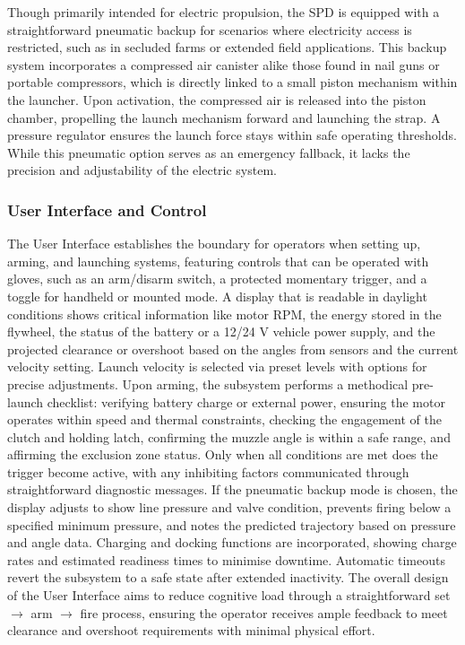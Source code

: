 \documentclass[a4paper,10pt]{article} %
\begin{document}
Though primarily intended for electric propulsion, the SPD is equipped with a straightforward pneumatic backup for scenarios where electricity access is restricted, such as in secluded farms or extended field applications. This backup system incorporates a compressed air canister alike those found in nail guns or portable compressors, which is directly linked to a small piston mechanism within the launcher. Upon activation, the compressed air is released into the piston chamber, propelling the launch mechanism forward and launching the strap. A pressure regulator ensures the launch force stays within safe operating thresholds. While this pneumatic option serves as an emergency fallback, it lacks the precision and adjustability of the electric system.


\subsubsection{User Interface and Control}

The User Interface establishes the boundary for operators when setting up, arming, and launching systems, featuring controls that can be operated with gloves, such as an arm/disarm switch, a protected momentary trigger, and a toggle for handheld or mounted mode. A display that is readable in daylight conditions shows critical information like motor RPM, the energy stored in the flywheel, the status of the battery or a 12/24 V vehicle power supply, and the projected clearance or overshoot based on the angles from sensors and the current velocity setting. Launch velocity is selected via preset levels with options for precise adjustments. Upon arming, the subsystem performs a methodical pre-launch checklist: verifying battery charge or external power, ensuring the motor operates within speed and thermal constraints, checking the engagement of the clutch and holding latch, confirming the muzzle angle is within a safe range, and affirming the exclusion zone status. Only when all conditions are met does the trigger become active, with any inhibiting factors communicated through straightforward diagnostic messages. If the pneumatic backup mode is chosen, the display adjusts to show line pressure and valve condition, prevents firing below a specified minimum pressure, and notes the predicted trajectory based on pressure and angle data. Charging and docking functions are incorporated, showing charge rates and estimated readiness times to minimise downtime. Automatic timeouts revert the subsystem to a safe state after extended inactivity. The overall design of the User Interface aims to reduce cognitive load through a straightforward set $\rightarrow$ arm $\rightarrow$ fire process, ensuring the operator receives ample feedback to meet clearance and overshoot requirements with minimal physical effort.
\end{document}
